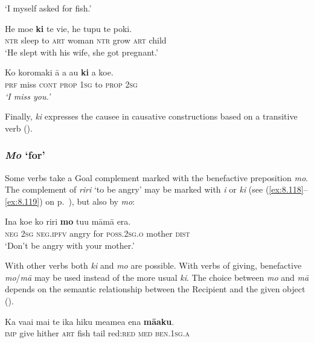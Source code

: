 \glt 
‘I myself asked for fish.’ \textstyleExampleref{[Mtx-7-04.061]}
\z

\ea\label{ex:8.176}
\gll He moe \textbf{ki} te vi{\ꞌ}e, he tupu te poki. \\
\textsc{ntr} sleep to \textsc{art} woman \textsc{ntr} grow \textsc{art} child \\

\glt 
‘He slept with his wife, she got pregnant.’ \textstyleExampleref{[Mtx-7-20.002]}
\z

\ea\label{ex:8.177}
\gll Ko koromaki {\ꞌ}ā a au \textbf{ki} a koe.\\
\textsc{prf} miss \textsc{cont} \textsc{prop} \textsc{1sg} to \textsc{prop} \textsc{2sg}\\

\glt
\textit{\textup{‘}}\textit{I miss you.’} \textstyleExampleref{[R208.203]} 
\z

Finally, \textit{ki} expresses the causee in causative constructions based on a transitive verb ().

\subsubsection{\textit{Mo} ‘for’}
Some verbs take a Goal complement marked with the benefactive preposition \textit{mo}. The complement of \textit{riri} ‘to be angry’ may be marked with \textit{i} or \textit{ki} (see (\ref{ex:8.118}–\ref{ex:8.119}) on p.~\pageref{ex:8.118}), but also by \textit{mo}:

\ea\label{ex:8.178}
\gll {\ꞌ}Ina koe ko riri \textbf{mo} tu{\ꞌ}u māmā era.\\
\textsc{neg} \textsc{2sg} \textsc{neg.ipfv} angry for \textsc{poss.2sg.o}\textsc{} mother \textsc{dist}\\

\glt
‘Don’t be angry with your mother.’ \textstyleExampleref{[R103.071]} 
\z

With other verbs both \textit{ki} and \textit{mo} are possible. With verbs of giving, benefactive \textit{mo}/\textit{mā} may be used instead of the more usual \textit{ki}. The choice between \textit{mo} and \textit{mā} depends on the semantic relationship between the Recipient and the given object ().

\ea\label{ex:8.179}
\gll Ka va{\ꞌ}ai mai te ika hiku meamea ena \textbf{mā{\ꞌ}aku}.\\
\textsc{imp} give hither \textsc{art} fish tail red:\textsc{red} \textsc{med} \textsc{ben.1sg.a}\\

